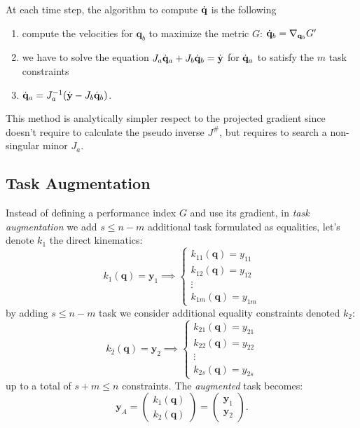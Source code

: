 \documentclass[10pt, a4paper]{report}
\begin{document}
At each time step, the algorithm to compute ${\dot{\mathbf q}}$ is the following\begin{enumerate}
    \item compute the velocities for $\mathbf q_b$ to maximize the metric $G$: ${\dot{\mathbf q}}_b=\nabla_{\mathbf q_b}G'$
    \item we have to solve the equation $J_a{\dot{\mathbf q}}_a+J_b{\dot{\mathbf q}}_b={\dot{\mathbf y}}$ for ${\dot{\mathbf q}}_a$ to satisfy the $m$ task constraints 
    \item ${\dot{\mathbf q}}_a=J_a^{-1}({\dot{\mathbf y}}-J_b{\dot{\mathbf q}}_b)$.
\end{enumerate}
This method is analytically simpler respect to the projected gradient since doesn't require to calculate the pseudo inverse $J^\#$, but requires to search a non-singular minor $J_a$.
\subsection{Task Augmentation}
Instead of defining a performance index $G$ and use its gradient, in \textit{task augmentation} we add $s\le n-m$ additional task formulated as equalities, let's denote $k_1$ the direct kinematics:\begin{equation}
    k_1(\mathbf q)=\mathbf y_1\implies \begin{cases}
        k_{11}(\mathbf q)=y_{11}\\
        k_{12}(\mathbf q)=y_{12}\\ \vdots \\ 
        k_{1m}(\mathbf q)=y_{1m}
    \end{cases}
\end{equation}
by adding $s\le n-m$ task we consider additional equality constraints denoted $k_2$:
\begin{equation}
    k_2(\mathbf q)=\mathbf y_2\implies \begin{cases}
        k_{21}(\mathbf q)=y_{21}\\
        k_{22}(\mathbf q)=y_{22}\\ \vdots \\ 
        k_{2s}(\mathbf q)=y_{2s}
    \end{cases}
\end{equation}
up to a total of $s+m\le n$ constraints. The \textit{augmented} task becomes:\begin{equation}
    \mathbf y_A=\begin{pmatrix}
        k_1(\mathbf q)\\ k_2(\mathbf q)
    \end{pmatrix}=\begin{pmatrix}
        \mathbf y_1\\ \mathbf y_2
    \end{pmatrix}.
\end{equation}
\end{document}
